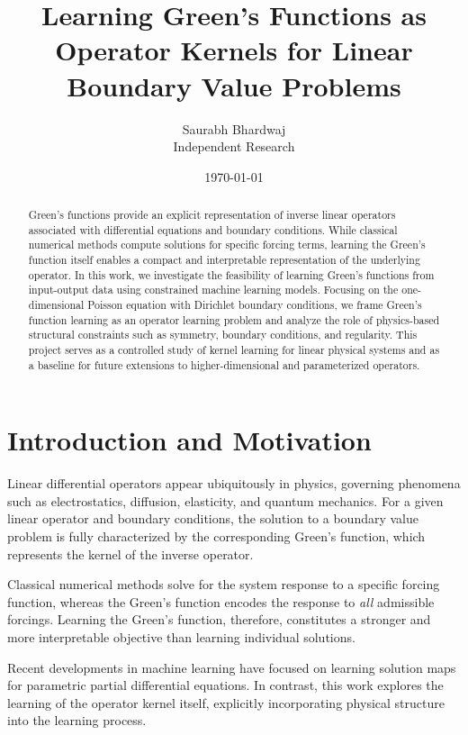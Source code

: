 \documentclass[11pt]{article}
\title{Learning Green's Functions as Operator Kernels for Linear Boundary Value Problems}
\author{Saurabh Bhardwaj \\ \small Independent Research}
\date{\today}
\begin{document}
\maketitle

\begin{abstract}
Green's functions provide an explicit representation of inverse linear operators
associated with differential equations and boundary conditions. While classical
numerical methods compute solutions for specific forcing terms, learning the
Green's function itself enables a compact and interpretable representation of
the underlying operator. In this work, we investigate the feasibility of learning
Green's functions from input-output data using constrained machine learning models.
Focusing on the one-dimensional Poisson equation with Dirichlet boundary conditions,
we frame Green's function learning as an operator learning problem and analyze the
role of physics-based structural constraints such as symmetry, boundary conditions,
and regularity. This project serves as a controlled study of kernel learning for
linear physical systems and as a baseline for future extensions to higher-dimensional
and parameterized operators.
\end{abstract}

\section{Introduction and Motivation}

Linear differential operators appear ubiquitously in physics, governing phenomena
such as electrostatics, diffusion, elasticity, and quantum mechanics. For a given
linear operator and boundary conditions, the solution to a boundary value problem
is fully characterized by the corresponding Green's function, which represents the
kernel of the inverse operator.

Classical numerical methods solve for the system response to a specific forcing
function, whereas the Green's function encodes the response to \emph{all} admissible
forcings. Learning the Green's function, therefore, constitutes a stronger and more
interpretable objective than learning individual solutions.

Recent developments in machine learning have focused on learning solution maps for
parametric partial differential equations. In contrast, this work explores the
learning of the operator kernel itself, explicitly incorporating physical structure
into the learning process.
\end{document}
